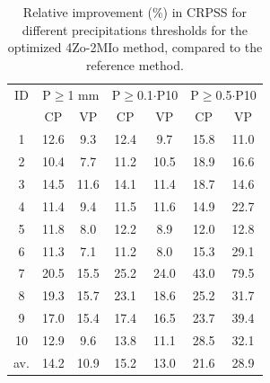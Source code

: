 \documentclass[review]{elsarticle}
\begin{document}
\begin{table}[t]
	\caption{Relative improvement (\%) in CRPSS for different precipitations thresholds for the optimized 4Zo-2MIo method, compared to the reference method.}
	\footnotesize
	\begin{center}
		\begin{tabular}{ccccccc}
			\hline 
			ID & \multicolumn{2}{c}{P\(\geq\)1 mm} & \multicolumn{2}{c}{P\(\geq\)0.1\(\cdot\)P10} & \multicolumn{2}{c}{P\(\geq\)0.5\(\cdot\)P10} \\  
			& CP & VP & CP & VP & CP & VP \\ 
			\hline 
			1 & 12.6 & 9.3 & 12.4 & 9.7 & 15.8 & 11.0 \\
			2 & 10.4 & 7.7 & 11.2 & 10.5 & 18.9 & 16.6 \\ 
			3 & 14.5 & 11.6 & 14.1 & 11.4 & 18.7 & 14.6 \\ 
			4 & 11.4 & 9.4 & 11.5 & 11.6 & 14.9 & 22.7 \\ 
			5 & 11.8 & 8.0 & 12.2 & 8.9 & 12.0 & 12.8 \\ 
			6 & 11.3 & 7.1 & 11.2 & 8.0 & 15.3 & 29.1 \\ 
			7 & 20.5 & 15.5 & 25.2 & 24.0 & 43.0 & 79.5 \\
			8 & 19.3 & 15.7 & 23.1 & 18.6 & 25.2 & 31.7 \\ 
			9 & 17.0 & 15.4 & 17.4 & 16.5 & 23.7 & 39.4 \\ 
			10 & 12.9 & 9.6 & 13.8 & 11.1 & 28.5 & 32.1 \\ 
			\hline 
			av. & 14.2 & 10.9 & 15.2 & 13.0 & 21.6 & 28.9 \\ 
			\hline 
		\end{tabular} 
	\end{center}
	\label{table:scores_thresholds_4Zo-2MIo}
\end{table}
	
	
	
\end{document}
